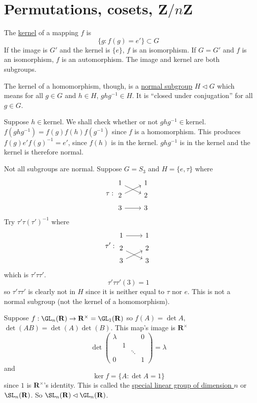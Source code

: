 \documentclass[11pt, oneside]{amsart}
\numberwithin{equation}{section}
\numberwithin{theorem}{section}
\theoremstyle{definition}
\def\Z{\mathbf{Z}}
\def\R{\mathbf{R}}
\begin{document}
\section{Permutations, cosets, $\Z/n\Z$}
The \underline{kernel} of a mapping $f$ is
$$
\{g : f(g) = e'\}\subset G
$$
If the image is $G'$ and the kernel is $\{e\}$, $f$ is an isomorphism. If $G=G'$ and $f$ is an isomorphism, $f$ is an automorphism. The image and kernel are both subgroups. 


The kernel of a homomorphism, though, is a \underline{normal subgroup} $H \lhd G$ which means for all $g\in G$ and $h\in H$, $ghg^{-1} \in H$. It is ``closed under conjugation'' for all $g\in G$.


Suppose $h\in \mathrm{kernel}$. We shall check whether or not $ghg^{-1} \in\mathrm{kernel}$. $f(ghg^{-1}) = f(g)f(h)f(g^{-1})$ since $f$ is a homomorphism. This produces $f(g)e'f(g)^{-1} = e'$, since $f(h) $ is in the kernel. $ghg^{-1}$ is in the kernel and the kernel is therefore normal.


Not all subgroups are normal. Suppose $G=S_3$ and $H=\{e,\tau\}$ where
$$
\tau : \begin{tikzcd}[row sep=tiny]
1 \arrow[rd]  & 1 \\ 2 \arrow[ru]& 2 \\ 3 \arrow[r]& 3
\end{tikzcd}
$$ 
Try $\tau'\tau(\tau')^{-1}$ where
$$
\tau' :  
\begin{tikzcd}[row sep=tiny]
1 \arrow[r]  & 1 \\ 2 \arrow[rd]& 2 \\ 3 \arrow[ru]& 3
\end{tikzcd}
$$
which is $\tau'\tau\tau'$. 
$$
\tau'\tau\tau'(3) = 1
$$
so $\tau'\tau\tau'$ is clearly not in $H$ since it is neither equal to $\tau$ nor $e$. This is not a normal subgroup (not the kernel of a homomorphism).


Suppose $f: \GL_n(\R)\to \R^\times=\GL_1(\R)$ so $f(A)=\det A$, $\det (AB) =\det(A)\det(B)$. This map's image is $\R^\times$
$$
\det\left(\begin{array}{cccc} \lambda &  & &0\\   & 1 &  & \\   &  &\ddots&  \\ 0&&&1\end{array}\right) = \lambda
$$ and
$$
\ker f = \{A : \det A = 1\}
$$
since $1$ is $\R^\times$'s identity. This is called the \underline{special linear group of dimension $n$} or $\SL_n(\R)$. So $\SL_n(\R) \lhd \GL_n(\R)$. 
\end{document}
